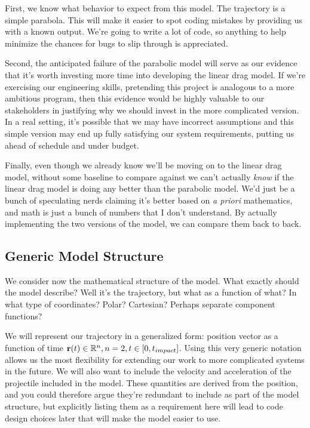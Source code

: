 First, we know what behavior to expect from this model. The trajectory is a simple parabola. This will make it easier to spot coding mistakes by providing us with a known output. We're going to write a lot of code, so anything to help minimize the chances for bugs to slip through is appreciated. 

Second, the anticipated failure of the parabolic model will serve as our evidence that it's worth investing more time into developing the linear drag model. If we're exercising our engineering skills, pretending this project is analogous to a more ambitious program, then this evidence would be highly valuable to our stakeholders in justifying why we should invest in the more complicated version. In a real setting, it's possible that we may have incorrect assumptions and this simple version may end up fully satisfying our system requirements, putting us ahead of schedule and under budget.

Finally, even though we already know we'll be moving on to the linear drag model, without some baseline to compare against we can't actually \textit{know} if the linear drag model is doing any better than the parabolic model. We'd just be a bunch of speculating nerds claiming it's better based on \textit{a priori} mathematics, and math is just a bunch of numbers that I don't understand. By actually implementing the two versions of the model, we can compare them back to back. 

\subsection{Generic Model Structure}

We consider now the mathematical structure of the model. What exactly should the model describe? Well it's the trajectory, but what as a function of what? In what type of coordinates? Polar? Cartesian? Perhaps separate component functions?

We will represent our trajectory in a generalized form: position vector as a function of time ${\bf r}(t) \in \mathbb{R}^n, n = 2, t \in [0,t_{impact}]$. Using this very generic notation allows us the most flexibility for extending our work to more complicated systems in the future. We will also want to include the velocity and acceleration of the projectile included in the model. These quantities are derived from the position, and you could therefore argue they're redundant to include as part of the model structure, but explicitly listing them as a requirement here will lead to code design choices later that will make the model easier to use.

